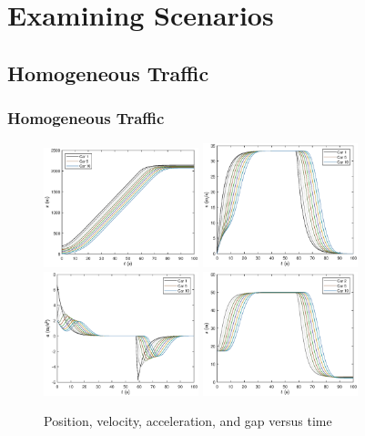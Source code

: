 \documentclass{beamer}
\begin{document}
\section{Examining Scenarios}

\subsection{Homogeneous Traffic}

\begin{frame}
  \frametitle{Homogeneous Traffic}
  \begin{figure}[H]
    \includegraphics[width=4.5cm]{HomogeneousTraffic1.eps}
    \includegraphics[width=4.5cm]{HomogeneousTraffic2.eps}
    \includegraphics[width=4.5cm]{HomogeneousTraffic3.eps}
    \includegraphics[width=4.5cm]{HomogeneousTraffic4.eps}
    \caption{Position, velocity, acceleration, and gap versus time}
\end{figure}
\end{frame}
\end{document}

